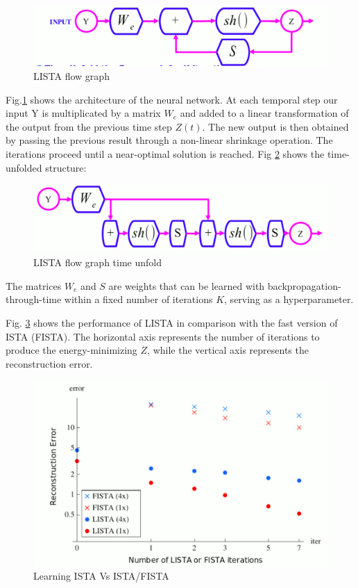 \begin{figure}[H]
  \includegraphics[width=\linewidth]{lectures/12-a/FISTAFlowGraph.jpg}
  \caption{LISTA flow graph}
  \label{fig:fistaFlowGraph}
\end{figure}

Fig.\ref{fig:fistaFlowGraph} shows the architecture of the neural network. At each temporal step our input Y is multiplicated by a matrix $W_e$ and added to a linear transformation of the output from the previous time step $Z(t)$. The new output is then obtained by passing the previous result through a non-linear shrinkage operation. The iterations proceed until a near-optimal solution is reached. Fig \ref{fig:fistaFlowGraphTimeUnfold} shows the time-unfolded structure: 

\begin{figure}[H]
  \includegraphics[width=\linewidth]{lectures/12-a/FISTAFlowGraphTimeUnfold.jpg}
  \caption{LISTA flow graph time unfold}
  \label{fig:fistaFlowGraphTimeUnfold}
\end{figure}

The matrices $W_e$ and $S$ are weights that can be learned with backpropagation-through-time within a fixed number of iterations $K$, serving as a hyperparameter.

Fig. \ref{fig:listaFista} shows the performance of LISTA in comparison with the fast version of ISTA (FISTA). The horizontal axis represents the number of iterations to produce the energy-minimizing $Z$, while the vertical axis represents the reconstruction error. 


\begin{figure}[h!]
  \includegraphics[width=\linewidth]{lectures/12-a/FISTALISTA.jpg}
  \caption{Learning ISTA Vs ISTA/FISTA}
  \label{fig:listaFista}
\end{figure}


